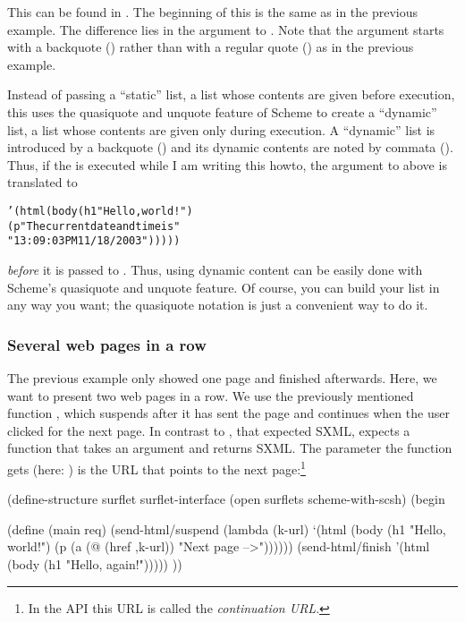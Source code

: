 This \surflet can be found in .  The
beginning of this \surflet is the same as in the previous example.
The difference lies in the argument to .  Note
that the argument starts with a backquote () rather than with
a regular quote () as in the previous example.

Instead of passing a ``static'' list, \ie a list whose contents are
given before execution, this \surflet uses the quasiquote and unquote
feature of Scheme to create a ``dynamic'' list, \ie a list whose
contents are given only during execution.  A ``dynamic'' list is
introduced by a backquote () and its dynamic contents are
noted by commata (\typew{,}).  Thus, if the \surflet is executed while
I am writing this howto, the argument to  above
is translated to

\begin{alltt}
       '(html (body (h1 "Hello, world!")
                    (p "The current date and time is "
                       "13:09:03 PM 11/18/2003")))))
\end{alltt}

\noindent\emph{before} it is passed to .  Thus, using
dynamic content can be easily done with Scheme's quasiquote and
unquote feature.  Of course, you can build your list in any way you
want; the quasiquote notation is just a convenient way to do it.


\subsubsection{Several web pages in a row}

The previous example \surflets only showed one page and finished
afterwards.  Here, we want to present two web pages in a row.  We use
the previously mentioned function , which
suspends after it has sent the page and continues when the user
clicked for the next page.  In contrast to ,
that expected SXML,  expects a function that
takes an argument and returns SXML.  The parameter the function gets
(here: ) is the URL that points to the next
page:\footnote{In the API this URL is called the \emph{continuation
URL}.}

\begin{listing}
(define-structure surflet surflet-interface
  (open surflets
        scheme-with-scsh)
  (begin
    
    (define (main req)
      (send-html/suspend
       (lambda (k-url)
         `(html (body (h1 "Hello, world!")
                      (p (a (@ (href ,k-url)) "Next page -->"))))))
      (send-html/finish
       '(html (body (h1 "Hello, again!")))))
    ))
\end{listing}

